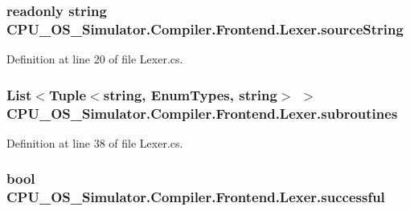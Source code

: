\subsubsection[{source\+String}]{\setlength{\rightskip}{0pt plus 5cm}readonly string C\+P\+U\+\_\+\+O\+S\+\_\+\+Simulator.\+Compiler.\+Frontend.\+Lexer.\+source\+String\hspace{0.3cm}{\ttfamily [private]}}\label{class_c_p_u___o_s___simulator_1_1_compiler_1_1_frontend_1_1_lexer_a735068e1008912edac69416bac78cef1}


Definition at line 20 of file Lexer.\+cs.

\hypertarget{class_c_p_u___o_s___simulator_1_1_compiler_1_1_frontend_1_1_lexer_a45c844ee9a1f5dedb94dcb4f19883d5a}{}
\subsubsection[{subroutines}]{\setlength{\rightskip}{0pt plus 5cm}List$<$Tuple$<$string, {\bf Enum\+Types}, string$>$ $>$ C\+P\+U\+\_\+\+O\+S\+\_\+\+Simulator.\+Compiler.\+Frontend.\+Lexer.\+subroutines\hspace{0.3cm}{\ttfamily [private]}}\label{class_c_p_u___o_s___simulator_1_1_compiler_1_1_frontend_1_1_lexer_a45c844ee9a1f5dedb94dcb4f19883d5a}


Definition at line 38 of file Lexer.\+cs.

\hypertarget{class_c_p_u___o_s___simulator_1_1_compiler_1_1_frontend_1_1_lexer_ad2b45c1eaf05bca9d992ed22a0331bae}{}
\subsubsection[{successful}]{\setlength{\rightskip}{0pt plus 5cm}bool C\+P\+U\+\_\+\+O\+S\+\_\+\+Simulator.\+Compiler.\+Frontend.\+Lexer.\+successful\hspace{0.3cm}{\ttfamily [private]}}\label{class_c_p_u___o_s___simulator_1_1_compiler_1_1_frontend_1_1_lexer_ad2b45c1eaf05bca9d992ed22a0331bae}


